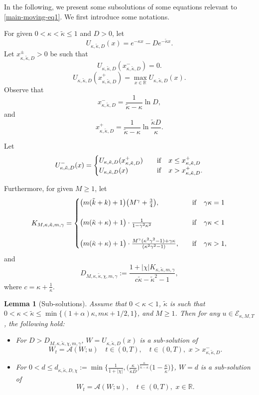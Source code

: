 \documentclass[11pt]{article} %
\newtheorem{lemma}{Lemma}[section]
\theoremstyle{remark}
\theoremstyle{remark}
\numberwithin{equation}{section}
\numberwithin{figure}{section}
\numberwithin{table}{section}
\newcommand\RR{\ensuremath{\mathbb{R}}}
\begin{document}
In the following, we present some subsolutions of some equations relevant to \eqref{main-moving-eq1}. 
We first introduce some notations.

For given $0<\kappa<\tilde \kappa\le 1$ and  $D>0$, let 
$$
U_{\kappa,\tilde\kappa, D}(x)= e^{-\kappa x}-De^{-\tilde{\kappa}x}.
$$
Let $x^\pm _{\kappa,\tilde\kappa,D}>0$ be such that
$$
U_{\kappa,\tilde\kappa,D}(x^-_{\kappa,\tilde \kappa, D})=0.
$$
$$
U_{\kappa,\tilde \kappa,D}(x^+_{\kappa,\tilde\kappa,D})=\max_{x\in\RR} U_{\kappa,\tilde\kappa, D}(x).
$$
Observe that
$$
x^-_{\kappa,\tilde\kappa,D}=\frac{1}{\tilde\kappa -\kappa}\ln D,
$$
and
$$
x^+_{\kappa,\tilde\kappa,D}=\frac{1}{\tilde\kappa -\kappa}\ln \frac{\tilde\kappa D}{\kappa}.
$$

Let 
$$
U^-_{\kappa,\tilde\kappa,D}(x)=\begin{cases}  U_{\kappa,\tilde\kappa,D}(x^+_{\kappa,\tilde\kappa,D}) \quad &{\rm if}\quad x\le x^+_{\kappa,\tilde \kappa,D}\cr
U_{\kappa,\tilde\kappa,D} (x)\quad &{\rm if}\quad x>x^+_{\kappa,\tilde\kappa,D}.
\end{cases}
$$

Furthermore,
for given $M\ge 1$, let 
$$
K_{M, \kappa,\tilde\kappa,m,\gamma}=\begin{cases}
\big(m(\tilde k+k)+1\big) \big(M^\gamma+\frac{3}{4}\big) ,\quad &{\rm if}\quad \gamma\kappa =1\cr\cr
 \big(m (\tilde \kappa+\kappa)+1\big)\cdot \frac{1}{1-\gamma^2 \kappa^2} \quad &{\rm if}\quad \gamma\kappa<1\cr\cr
 \big(m(\tilde\kappa +\kappa)+1\big)\cdot \frac{M^\gamma(\kappa^2\gamma^2-1)+\gamma\kappa}{ (\kappa^2\gamma^2-1)} ,\quad &{\rm if}\quad \gamma \kappa>1,
\end{cases}
$$
and
$$
D_{M,\kappa,\tilde\kappa,\chi,m,\gamma}:=\frac{1+|\chi|K_{\kappa,\tilde\kappa,m,\gamma}}{c\tilde \kappa-\tilde\kappa^2-1},
$$
where $c=\kappa+\frac{1}{\kappa}$.







\begin{lemma}[Sub-solutions]
\label{prelim-sub-lm}
Assume that  $0<\kappa<1$,   $\tilde \kappa$ is such that $0<\kappa<\tilde \kappa \le \min\{ (1+\alpha)\kappa,  m\kappa +1/2,  1\}$, and $M\ge 1$.
Then 
for any $u\in \mathcal{E}_{\kappa,M,T}$, the following hold:
\begin{itemize}
\item[(1)] For $D> D_{M,\kappa,\tilde\kappa,\chi,m,\gamma}$, 
{$W=U_{\kappa,\tilde\kappa, D}(x)$}  is a sub-solution of
$$
W_t= \mathcal{A}(W;u)\quad  t\in (0,T),\quad t\in (0,T),\,\,  x>x^-_{\kappa,\tilde\kappa,D}.
$$


\item[(2)]   For $0<d\le  d_{\kappa,\tilde \kappa,D,\chi}:=\min\Big\{\frac{1}{1+|\chi|}, \Big(\frac{\kappa}{\tilde\kappa D}\Big)^{\frac{\kappa}{\tilde \kappa -\kappa}}\Big(1-\frac{\kappa}{\tilde \kappa}\Big)\Big\}$, $W=d$ is a sub-solution of
$$
W_t= \mathcal{A}(W;u),\quad t\in (0,T),\,\,  x\in\RR.
$$ 
\end{itemize}
\end{lemma}
\end{document}
